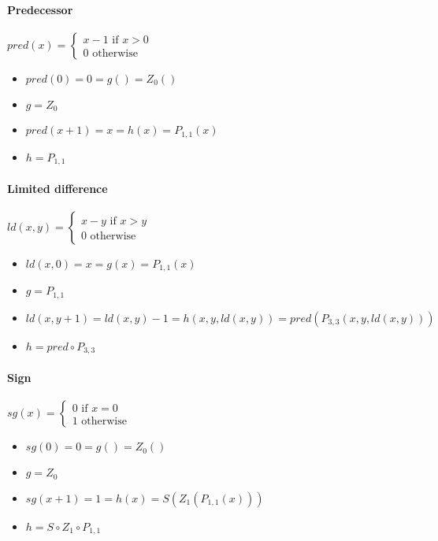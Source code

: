 \documentclass{article}
\begin{document}
\paragraph{Predecessor} $pred(x) = 
\begin{cases}
x-1 \mbox{ if } x>0 \\
0 \mbox{ otherwise}
\end{cases}$
\begin{itemize}[noitemsep,nolistsep]
  \item $pred(0) = 0 = g() = Z_0()$
  \item $g = Z_0$
  \item $pred(x+1) = x = h(x) = P_{1,1}(x)$
  \item $h = P_{1,1}$
\end{itemize}

\paragraph{Limited difference} $ld(x,y) = 
\begin{cases}
x-y \mbox{ if } x>y \\
0 \mbox{ otherwise}
\end{cases}$
\begin{itemize}[noitemsep,nolistsep]
  \item $ld(x,0) = x = g(x) = P_{1,1}(x)$
  \item $g = P_{1,1}$
  \item $ld(x,y+1) = ld(x,y)-1 = h(x,y,ld(x,y)) = pred(P_{3,3}(x,y,ld(x,y)))$
  \item $h = pred \circ P_{3,3}$
\end{itemize}

\paragraph{Sign} $sg(x) = \begin{cases}
0 \mbox{ if } x=0 \\
1 \mbox{ otherwise}
\end{cases}$
\begin{itemize}[noitemsep,nolistsep]
  \item $sg(0) = 0 = g() = Z_0()$
  \item $g = Z_0$
  \item $sg(x+1) = 1 = h(x) = S(Z_1(P_{1,1}(x)))$
  \item $h = S \circ Z_1 \circ P_{1,1}$
\end{itemize}

% 
\end{document}
